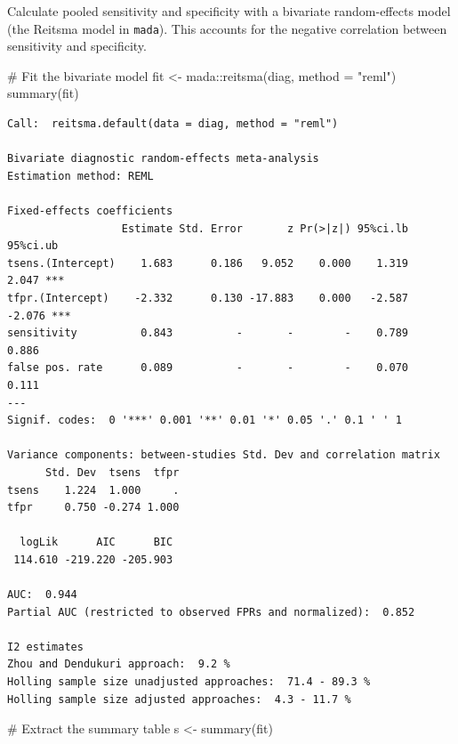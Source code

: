\documentclass[
  letterpaper,
  DIV=11,
  numbers=noendperiod]{scrartcl}
\newenvironment{Shaded}{\begin{snugshade}}{\end{snugshade}}
\newcommand{\AttributeTok}[1]{\textcolor[rgb]{0.40,0.45,0.13}{#1}}
\newcommand{\CommentTok}[1]{\textcolor[rgb]{0.37,0.37,0.37}{#1}}
\newcommand{\FunctionTok}[1]{\textcolor[rgb]{0.28,0.35,0.67}{#1}}
\newcommand{\NormalTok}[1]{\textcolor[rgb]{0.00,0.23,0.31}{#1}}
\newcommand{\OtherTok}[1]{\textcolor[rgb]{0.00,0.23,0.31}{#1}}
\newcommand{\SpecialCharTok}[1]{\textcolor[rgb]{0.37,0.37,0.37}{#1}}
\newcommand{\StringTok}[1]{\textcolor[rgb]{0.13,0.47,0.30}{#1}}
\begin{document}
Calculate pooled sensitivity and specificity with a bivariate
random-effects model (the Reitsma model in \texttt{mada}). This accounts
for the negative correlation between sensitivity and specificity.

\begin{Shaded}
\begin{Highlighting}[]
\CommentTok{\# Fit the bivariate model}
\NormalTok{fit }\OtherTok{\textless{}{-}}\NormalTok{ mada}\SpecialCharTok{::}\FunctionTok{reitsma}\NormalTok{(diag, }\AttributeTok{method =} \StringTok{"reml"}\NormalTok{)}
\FunctionTok{summary}\NormalTok{(fit)}
\end{Highlighting}
\end{Shaded}

\begin{verbatim}
Call:  reitsma.default(data = diag, method = "reml")

Bivariate diagnostic random-effects meta-analysis
Estimation method: REML

Fixed-effects coefficients
                  Estimate Std. Error       z Pr(>|z|) 95%ci.lb 95%ci.ub    
tsens.(Intercept)    1.683      0.186   9.052    0.000    1.319    2.047 ***
tfpr.(Intercept)    -2.332      0.130 -17.883    0.000   -2.587   -2.076 ***
sensitivity          0.843          -       -        -    0.789    0.886    
false pos. rate      0.089          -       -        -    0.070    0.111    
---
Signif. codes:  0 '***' 0.001 '**' 0.01 '*' 0.05 '.' 0.1 ' ' 1 

Variance components: between-studies Std. Dev and correlation matrix
      Std. Dev  tsens  tfpr
tsens    1.224  1.000     .
tfpr     0.750 -0.274 1.000

  logLik      AIC      BIC 
 114.610 -219.220 -205.903 

AUC:  0.944
Partial AUC (restricted to observed FPRs and normalized):  0.852

I2 estimates 
Zhou and Dendukuri approach:  9.2 % 
Holling sample size unadjusted approaches:  71.4 - 89.3 % 
Holling sample size adjusted approaches:  4.3 - 11.7 %
\end{verbatim}

\begin{Shaded}
\begin{Highlighting}[]
\CommentTok{\# Extract the summary table}
\NormalTok{s }\OtherTok{\textless{}{-}} \FunctionTok{summary}\NormalTok{(fit)}
\end{Highlighting}
\end{Shaded}
\end{document}
